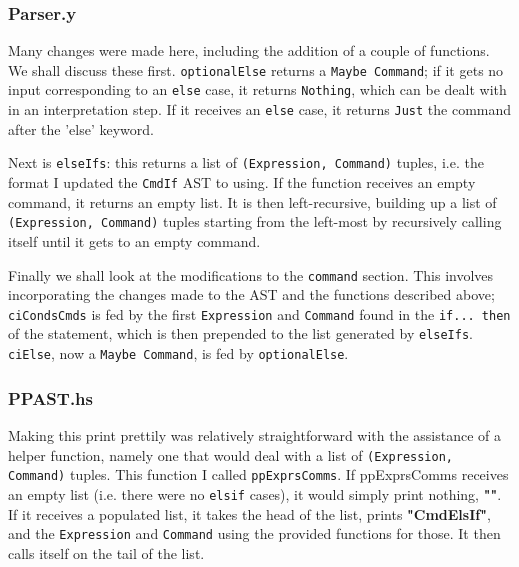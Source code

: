 \documentclass[12pt]{article}
\newcommand{\lstin}[3]{%
  
}
\begin{document}
\lstin{101}{105}{AST.hs}

\subsubsection{Parser.y}
Many changes were made here, including the addition of a couple of functions. 
We shall discuss these first. 
\verb|optionalElse| returns a \verb|Maybe Command|; if it gets no input corresponding to an \verb|else| case, it returns \verb|Nothing|, which can be dealt with in an interpretation step. 
If it receives an \verb|else| case, it returns \verb|Just| the command after the 'else' keyword.

\lstin{133}{135}{Parser.y}

Next is \verb|elseIfs|: this returns a list of \verb|(Expression, Command)| tuples, i.e. the format I updated the \verb|CmdIf| AST to using. 
If the function receives an empty command, it returns an empty list. 
It is then left-recursive, building up a list of \verb|(Expression, Command)| tuples starting from the left-most by recursively calling itself until it gets to an empty command.

\lstin{137}{139}{Parser.y}

Finally we shall look at the modifications to the \verb|command| section. 
This involves incorporating the changes made to the AST and the functions described above; \verb|ciCondsCmds| is fed by the first \verb|Expression| and \verb|Command| found in the \verb|if... then| of the statement, which is then prepended to the list generated by \verb|elseIfs|. 
\verb|ciElse|, now a \verb|Maybe Command|, is fed by \verb|optionalElse|.

\lstin{118}{119}{Parser.y}

\subsubsection{PPAST.hs}
Making this print prettily was relatively straightforward with the assistance of a helper function, namely one that would deal with a list of \verb|(Expression, Command)| tuples. 
This function I called \verb|ppExprsComms|. 
If ppExprsComms receives an empty list (i.e. there were no \verb|elsif| cases), it would simply print nothing, \textbf{""}. 
If it receives a populated list, it takes the head of the list, prints \textbf{"CmdElsIf"}, and the \verb|Expression| and \verb|Command| using the provided functions for those. 
It then calls itself on the tail of the list.

\lstin{82}{88}{PPAST.hs}
\end{document}
